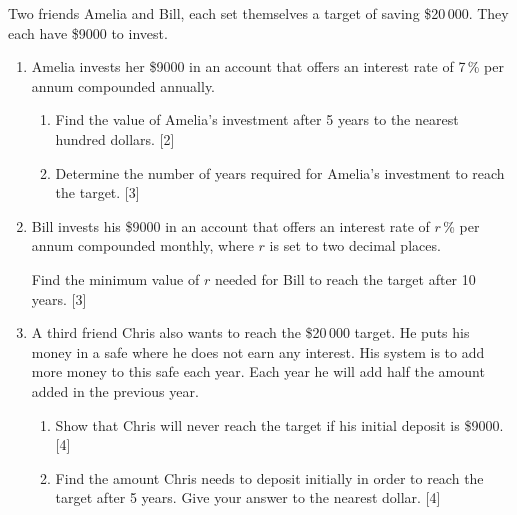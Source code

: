 \documentclass[12pt, twoside]{article}
\begin{document}
\begin{enumerate}[itemsep=0.15cm]
Two friends Amelia and Bill, each set themselves a target of saving \$20\,000.
They each have \$9000 to invest.

\begin{enumerate}[itemsep=0.15cm]
  \item Amelia invests her \$9000 in an account that offers an interest rate
  of 7\,\% per annum compounded annually.

  \begin{enumerate}[itemsep=0.1cm]
    \item[(i)] Find the value of Amelia's investment after 5 years to
    the nearest hundred dollars. \hfill [2]
    \item[(ii)] Determine the number of years required for Amelia's
    investment to reach the target. \hfill [3]
  \end{enumerate}

  \item Bill invests his \$9000 in an account that offers an interest rate
  of $r$\,\% per annum compounded monthly, where $r$ is set to two
  decimal places.

  Find the minimum value of $r$ needed for Bill to reach the target
  after 10 years. \hfill [3]

  \item A third friend Chris also wants to reach the \$20\,000 target.
  He puts his money in a safe where he does not earn any interest.
  His system is to add more money to this safe each year.
  Each year he will add half the amount added in the previous year.

  \begin{enumerate}[itemsep=0.1cm]
    \item[(i)] Show that Chris will never reach the target if his initial
    deposit is \$9000. \hfill [4]
    \item[(ii)] Find the amount Chris needs to deposit initially in order
    to reach the target after 5 years. Give your answer to the nearest
    dollar. \hfill [4]
  \end{enumerate}
\end{enumerate}

\end{enumerate}
\end{document}
